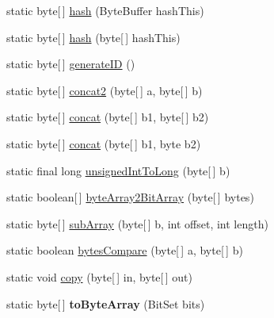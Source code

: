 \begin{DoxyCompactItemize}
\item 
static byte\mbox{[}$\,$\mbox{]} \hyperlink{classj_bittorrent_a_p_i_1_1_utils_a91280c1132a48372fdf2d9f1f3e92561}{hash} (ByteBuffer hashThis)
\item 
static byte\mbox{[}$\,$\mbox{]} \hyperlink{classj_bittorrent_a_p_i_1_1_utils_a755d6d5ea59374b5819a602d8c17e38d}{hash} (byte\mbox{[}$\,$\mbox{]} hashThis)
\item 
static byte\mbox{[}$\,$\mbox{]} \hyperlink{classj_bittorrent_a_p_i_1_1_utils_afffec79721b859efde246c770b7b8eef}{generateID} ()
\item 
static byte\mbox{[}$\,$\mbox{]} \hyperlink{classj_bittorrent_a_p_i_1_1_utils_ad86687ff941621b6c25fd61a9964ad99}{concat2} (byte\mbox{[}$\,$\mbox{]} a, byte\mbox{[}$\,$\mbox{]} b)
\item 
static byte\mbox{[}$\,$\mbox{]} \hyperlink{classj_bittorrent_a_p_i_1_1_utils_ad7376ac993610cb4518149ededfdc708}{concat} (byte\mbox{[}$\,$\mbox{]} b1, byte\mbox{[}$\,$\mbox{]} b2)
\item 
static byte\mbox{[}$\,$\mbox{]} \hyperlink{classj_bittorrent_a_p_i_1_1_utils_a3d0e19739caba5327615181ca58c3935}{concat} (byte\mbox{[}$\,$\mbox{]} b1, byte b2)
\item 
static final long \hyperlink{classj_bittorrent_a_p_i_1_1_utils_a2f60eb5883519574e6940ade17c3de31}{unsignedIntToLong} (byte\mbox{[}$\,$\mbox{]} b)
\item 
static boolean\mbox{[}$\,$\mbox{]} \hyperlink{classj_bittorrent_a_p_i_1_1_utils_a204e607231ce013be4ab1f9f67f7b30c}{byteArray2BitArray} (byte\mbox{[}$\,$\mbox{]} bytes)
\item 
static byte\mbox{[}$\,$\mbox{]} \hyperlink{classj_bittorrent_a_p_i_1_1_utils_af11025ce67b4509b7698a0294c301fbd}{subArray} (byte\mbox{[}$\,$\mbox{]} b, int offset, int length)
\item 
static boolean \hyperlink{classj_bittorrent_a_p_i_1_1_utils_a082c4145565ec408c591c1fef4d00163}{bytesCompare} (byte\mbox{[}$\,$\mbox{]} a, byte\mbox{[}$\,$\mbox{]} b)
\item 
static void \hyperlink{classj_bittorrent_a_p_i_1_1_utils_aaae31a73f74ed3c0e7a6155324c4ca10}{copy} (byte\mbox{[}$\,$\mbox{]} in, byte\mbox{[}$\,$\mbox{]} out)
\item 
\hypertarget{classj_bittorrent_a_p_i_1_1_utils_af9457b8a83c55e7faedd48730f06c50b}{
static byte\mbox{[}$\,$\mbox{]} {\bfseries toByteArray} (BitSet bits)}
\label{classj_bittorrent_a_p_i_1_1_utils_af9457b8a83c55e7faedd48730f06c50b}

\end{DoxyCompactItemize}


